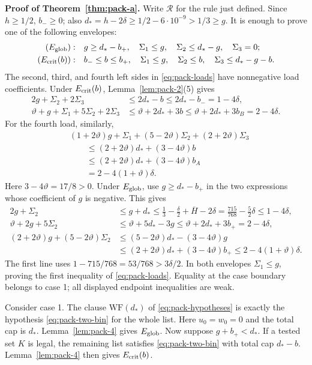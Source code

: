 \textbf{Proof of Theorem~\ref{thm:pack-a}.} Write $\mathcal R$ for the rule just
defined. Since $h\ge1/2$, $b_-\ge0$; also
$d_*=h-2\delta\ge1/2-6\cdot10^{-9}>1/3\ge g$.
It is enough to prove one of the following envelopes:
\[
\begin{split}
 (E_{\rm glob}):&\quad g\ge d_*-b_+,\quad
 \Sigma_1\le g,\quad\Sigma_2\le d_*-g,\quad\Sigma_3=0;\\
 (E_{\rm crit}(b)):&\quad b_-\le b\le b_+,\quad
 \Sigma_1\le g,\quad\Sigma_2\le b,\quad
 \Sigma_3\le d_*-g-b.
\end{split}
\]
The second, third, and fourth left sides in \eqref{eq:pack-loads}
have nonnegative load coefficients. Under $E_{\rm crit}(b)$,
Lemma~\ref{lem:pack-2}(5) gives
\[
\begin{aligned}
2g+\Sigma_2+2\Sigma_3&\le2d_*-b\le2d_*-b_-=1-4\delta,\\
\vartheta+g+\Sigma_1+5\Sigma_2+2\Sigma_3
 &\le\vartheta+2d_*+3b
 \le\vartheta+2d_*+3b_B=2-4\delta.
\end{aligned}
\]
For the fourth load, similarly,
\[
\begin{aligned}
 &(1+2\vartheta)g+\Sigma_1+(5-2\vartheta)\Sigma_2
       +(2+2\vartheta)\Sigma_3\\
 &\qquad\le(2+2\vartheta)d_*+(3-4\vartheta)b\\
 &\qquad\le(2+2\vartheta)d_*+(3-4\vartheta)b_A\\
 &\qquad=2-4(1+\vartheta)\delta.
\end{aligned}
\]
Here $3-4\vartheta=17/8>0$. Under $E_{\rm glob}$, use
$g\ge d_*-b_+$ in the two expressions whose coefficient of $g$
is negative. This gives
\[
\begin{aligned}
2g+\Sigma_2&\le g+d_*
 \le\tfrac13-\tfrac\delta2+\overline H-2\delta
 =\tfrac{715}{768}-\tfrac52\delta\le1-4\delta,\\
\vartheta+2g+5\Sigma_2&\le\vartheta+5d_*-3g
 \le\vartheta+2d_*+3b_+=2-4\delta,\\
(2+2\vartheta)g+(5-2\vartheta)\Sigma_2
 &\le(5-2\vartheta)d_*-(3-4\vartheta)g\\
 &\le(2+2\vartheta)d_*+(3-4\vartheta)b_+
 \le2-4(1+\vartheta)\delta.
\end{aligned}
\]
The first line uses $1-715/768=53/768>3\delta/2$.
In both envelopes $\Sigma_1\le g$, proving the first inequality
of \eqref{eq:pack-loads}. Equality at the case boundary belongs to
case 1; all displayed endpoint inequalities are weak.

Consider case 1. The clause $\mathrm{WF}(d_*)$ of
\eqref{eq:pack-hypotheses} is exactly the hypothesis
\eqref{eq:pack-two-bin} for the whole list. Here $u_0=w_0=0$ and the
total cap is $d_*$.
Lemma~\ref{lem:pack-4} gives $E_{\rm glob}$. Now suppose
$g+b_+<d_*$. If a tested set $K$ is legal, the remaining list
satisfies \eqref{eq:pack-two-bin} with total cap $d_*-b$. Lemma~\ref{lem:pack-4}
then gives $E_{\rm crit}(b)$.

